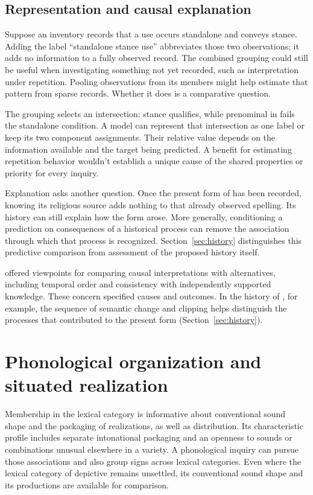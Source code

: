 \documentclass[12pt]{article}
\begin{document}
\subsection{Representation and causal explanation}

Suppose an inventory records that a use occurs standalone and conveys
stance. Adding the label \enquote{standalone stance use} abbreviates
those two observations; it adds no information to a fully observed
record. The combined grouping could still be useful when investigating
something not yet recorded, such as interpretation under repetition.
Pooling observations from its members might help estimate that pattern
from sparse records. Whether it does is a comparative question.

The grouping selects an intersection: stance  qualifies,
while prenominal  in  fails the
standalone condition. A model can represent that intersection as one
label or keep its two component assignments. Their relative value
depends on the information available and the target being predicted.
A benefit for estimating repetition behavior wouldn't establish a
unique cause of the shared properties or priority for every inquiry.

Explanation asks another question. Once the present form of 
has been recorded, knowing its religious source adds nothing to that
already observed spelling. Its history can still explain how the form
arose. More generally, conditioning a prediction on consequences of a
historical process can remove the association through which that process
is recognized. Section~\ref{sec:history} distinguishes this predictive
comparison from assessment of the proposed history itself.

\textcite[295--299]{hill1965} offered viewpoints for comparing causal
interpretations with alternatives, including temporal order and consistency
with independently supported knowledge. These concern specified causes
and outcomes. In the history of , for example, the
sequence of semantic change and clipping helps distinguish the processes
that contributed to the present form (Section~\ref{sec:history}).

\section{Phonological organization and situated realization}\label{sec:phonology}

Membership in the lexical category is informative about conventional sound
shape and the packaging of realizations, as well as distribution. Its characteristic profile includes separate intonational
packaging and an openness to sounds or combinations unusual elsewhere
in a variety. A phonological inquiry can pursue those associations
and also group signs across lexical categories. Even where the lexical
category of depictive  remains unsettled, its conventional
sound shape and its productions are available for comparison.
\end{document}
